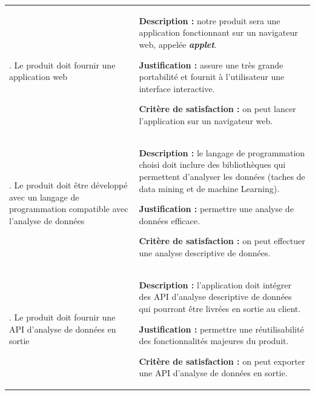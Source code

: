		\begin{center}\begin{longtable}{|>{\centering}m{3cm}|>{\raggedright\arraybackslash}m{10cm}|}			
				\hline \multicolumn{1}{|c}{\textbf{Contrainte}} & \multicolumn{1}{|c|}{\textbf{Fiche}} \\
				\hline 	1. Le produit doit fournir une application web &
						\begin{description}[style=unboxed,leftmargin=0.2cm]
						\item{\textbf{Description :}} notre produit sera une application fonctionnant sur un navigateur web, appelée \textbf{\textit{applet}}.
						\item{\textbf{Justification :}} assure une très grande portabilité et fournit à l'utilisateur une interface interactive.
						\item{\textbf{Critère de satisfaction :}} on peut lancer l'application sur un navigateur web.
						\end{description}\\
				\hline 2. Le produit doit être développé avec un langage de programmation compatible avec l'analyse de données &
						\begin{description}[style=unboxed,leftmargin=0.2cm]
						\item{\textbf{Description :}} le langage de programmation choisi doit inclure des bibliothèques qui permettent d'analyser les données (taches de data mining et de machine Learning).
						\item{\textbf{Justification :}} permettre une analyse de données efficace.
						\item{\textbf{Critère de satisfaction :}} on peut effectuer une analyse descriptive de données.
						\end{description}\\
				\hline 3. Le produit doit fournir une API d'analyse de données en sortie &
						\begin{description}[style=unboxed,leftmargin=0.2cm]
						\item{\textbf{Description :}} l'application doit intégrer des API d'analyse descriptive de données qui pourront être livrées en sortie au client.
						\item{\textbf{Justification :}} permettre une réutilisabilité des fonctionnalités majeures du produit.
						\item{\textbf{Critère de satisfaction :}} on peut exporter une API d'analyse de données en sortie.
						\end{description}\\
				\hline
				\end{longtable}\vspace{1em}\end{center}
			
